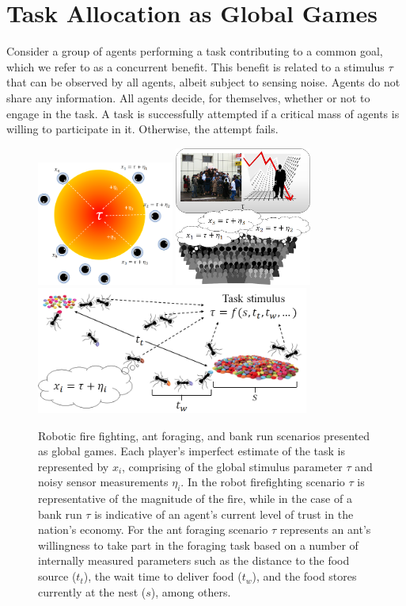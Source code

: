 \documentclass[smallextended]{svjour3}       %
\begin{document}
\section{Task Allocation as Global Games}\label{sec:globalgame}
Consider a group of agents performing a task contributing to a common goal, which we refer to as a concurrent benefit. This benefit is related to a stimulus $\tau$ that can be observed by all agents, albeit subject to sensing noise. Agents do not share any information. All agents decide, for themselves, whether or not to engage in the task. A task is successfully attempted if a critical mass of agents is willing to participate in it. Otherwise, the attempt fails.


\begin{figure}[ht!]
        \centering\includegraphics[width=0.4\textwidth]{figures/firefighting.png}
        \centering\includegraphics[width=0.4\textwidth]{figures/bankrun.png}
        \centering\includegraphics[width=0.8\textwidth]{figures/foraging.png}
    \caption{Robotic fire fighting, ant foraging, and bank run scenarios presented as global games. Each player's imperfect estimate of the task is represented by $x_i$, comprising of the global stimulus parameter $\tau$ and noisy sensor measurements $\eta_i$. In the robot firefighting scenario $\tau$ is representative of the magnitude of the fire, while in the case of a bank run $\tau$ is indicative of an agent's current level of trust in the nation's economy. For the ant foraging scenario $\tau$ represents an ant's willingness to take part in the foraging task based on a number of internally measured parameters such as the distance to the food source ($t_t$), the wait time to deliver food ($t_w$), and the food stores currently at the nest ($s$), among others.\label{fig:motivation}}    

\end{figure}
\end{document}
